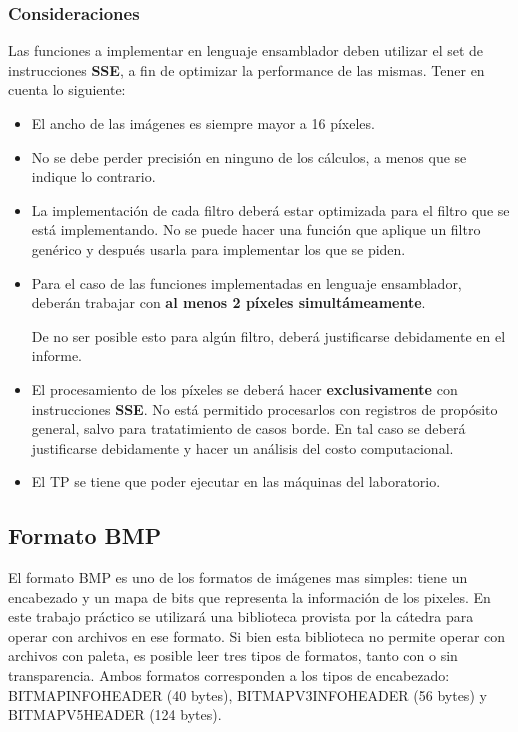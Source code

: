 \documentclass[a4paper, 12pt]{article}
\begin{document}
\subsubsection*{Consideraciones}

Las funciones a implementar en lenguaje ensamblador deben utilizar el set de
instrucciones \textbf{SSE}, a fin de optimizar la performance de las mismas.
Tener en cuenta lo siguiente:

\begin{itemize}
  \itemsep0em
  \item El ancho de las imágenes es siempre mayor a 16 píxeles.

  \item No se debe perder precisión en ninguno de los cálculos, a menos que se indique lo contrario.

  \item La implementación de cada filtro deberá estar optimizada para el
    filtro que se está implementando. No se puede hacer una función que
    aplique un filtro genérico y después usarla para implementar los que se
    piden.

  \item Para el caso de las funciones implementadas en lenguaje ensamblador,
    deberán trabajar con \textbf{al menos 2 píxeles simultámeamente}.

    De no ser posible esto para algún filtro, deberá justificarse
    debidamente en el informe.

  \item El procesamiento de los píxeles se deberá hacer
    \textbf{exclusivamente} con instrucciones \textbf{SSE}.
    No está permitido procesarlos con registros de propósito general,
    salvo para tratatimiento de casos borde. En tal caso se deberá
    justificarse debidamente y hacer un análisis del costo computacional.

  \item El TP se tiene que poder ejecutar en las máquinas del laboratorio.
\end{itemize}



\subsection{Formato BMP}

El formato BMP es uno de los formatos de imágenes mas simples: tiene un encabezado y un mapa de bits que representa la información de los pixeles.
En este trabajo práctico se utilizará una biblioteca provista por la cátedra para operar con archivos en ese formato.
Si bien esta biblioteca no permite operar con archivos con paleta, es posible leer tres tipos de formatos, tanto con o sin transparencia.
Ambos formatos corresponden a los tipos de encabezado: BITMAPINFOHEADER (40 bytes), BITMAPV3INFOHEADER (56 bytes) y BITMAPV5HEADER (124 bytes).
\smallskip
\end{document}
